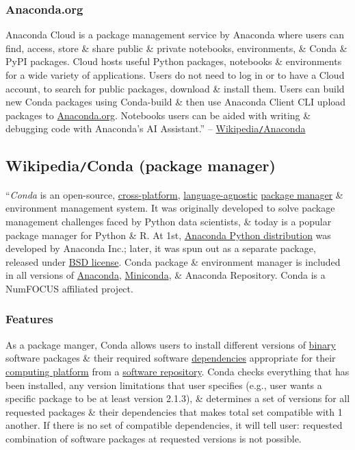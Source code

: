 \documentclass{article}
\begin{document}
\subsubsection{Anaconda.org}
Anaconda Cloud is a package management service by Anaconda where users can find, access, store \& share public \& private notebooks, environments, \& Conda \& PyPI packages. Cloud hosts useful Python packages, notebooks \& environments for a wide variety of applications. Users do not need to log in or to have a Cloud account, to search for public packages, download \& install them. Users can build new Conda packages using Conda-build \& then use Anaconda Client CLI upload packages to \url{Anaconda.org}. Notebooks users can be aided with writing \& debugging code with Anaconda's AI Assistant.'' -- \href{https://en.wikipedia.org/wiki/Anaconda_(Python_distribution)}{Wikipedia{\tt/}Anaconda}


\subsection{Wikipedia{\tt/}Conda (package manager)}
``{\it Conda} is an open-source, \href{https://en.wikipedia.org/wiki/Cross-platform}{cross-platform}, \href{https://en.wikipedia.org/wiki/Language-agnostic}{language-agnostic} \href{https://en.wikipedia.org/wiki/Package_manager}{package manager} \& environment management system. It was originally developed to solve package management challenges faced by Python data scientists, \& today is a popular package manager for Python \& R. At 1st, \href{https://en.wikipedia.org/wiki/Anaconda_(Python_distribution)}{Anaconda Python distribution} was developed by Anaconda Inc.; later, it was spun out as a separate package, released under \href{https://en.wikipedia.org/wiki/BSD_licenses}{BSD license}. Conda package \& environment manager is included in all versions of \href{https://en.wikipedia.org/wiki/Anaconda_(Python_distribution)}{Anaconda}, \href{https://en.wikipedia.org/wiki/Miniconda}{Miniconda}, \& Anaconda Repository. Conda is a NumFOCUS affiliated project.

\subsubsection{Features}
As a package manger, Conda allows users to install different versions of \href{https://en.wikipedia.org/wiki/Binary_file}{binary} software packages \& their required software \href{https://en.wikipedia.org/wiki/Coupling_(computer_programming)}{dependencies} appropriate for their \href{https://en.wikipedia.org/wiki/Computing_platform}{computing platform} from a \href{https://en.wikipedia.org/wiki/Software_repository}{software repository}. Conda checks everything that has been installed, any version limitations that user specifies (e.g., user wants a specific package to be at least version 2.1.3), \& determines a set of versions for all requested packages \& their dependencies that makes total set compatible with 1 another. If there is no set of compatible dependencies, it will tell user: requested combination of software packages at requested versions is not possible.
\end{document}
